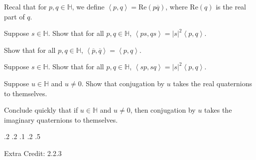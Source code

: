 \documentclass[minion]{homework}
\newcommand{\Reals}{\mathbb{R}}
\def\Quats{\mathbb{H}}
\def\ip<#1,#2>{\left<#1,#2\right>}
\newcommand{\vi}{\mathbf{i}}
\newcommand{\vj}{\mathbf{j}}
\newcommand{\vk}{\mathbf{k}}
\renewcommand{\Re}{\mathrm{Re}}
\begin{document}
\begin{problems}

\problem Recal that for $p,q \in \Quats$, we define $\ip<p,q>=\Re(p\overline q)$,
where $\Re(q)$ is the real part of $q$.
\begin{subproblems}
\item Suppose $s\in \Quats$.  Show that for all $p,q\in\Quats$,
$\ip<ps,qs> = |s|^2\ip<p,q>$.  
\item Show that for all $p,q\in\Quats$, $\ip<\overline p, \overline q>=\ip<p,q>$.
\item Suppose $s\in \Quats$.  Show that for all $p,q\in\Quats$,
$\ip<sp,sq> = |s|^2\ip<p,q>$.  
\item Suppose $u\in\Quats$ and $u\neq 0$.  Show that conjugation by $u$ takes the real quaternions to themselves.
\item Conclude quickly that if $u\in\Quats$ and $u\neq 0$, then
conjugation by $u$ takes the imaginary quaternions to themselves.
\end{subproblems}

.2
.2
.1
.2
.5

\problem Extra Credit: 2.2.3
\end{problems}
\end{document}
